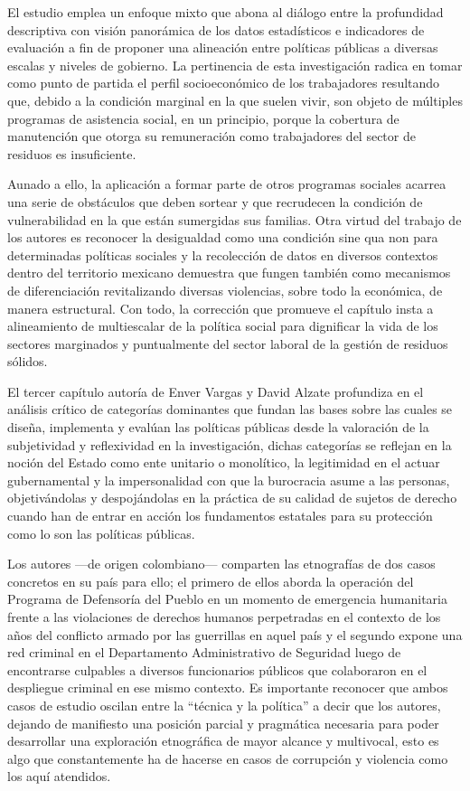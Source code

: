 \documentclass[
  spanish,
  11pt,
  a4paper,
]{scrbook}
\begin{document}
El estudio emplea un enfoque mixto que abona al diálogo entre la
profundidad descriptiva con visión panorámica de los datos estadísticos
e indicadores de evaluación a fin de proponer una alineación entre
políticas públicas a diversas escalas y niveles de gobierno. La
pertinencia de esta investigación radica en tomar como punto de partida
el perfil socioeconómico de los trabajadores resultando que, debido a la
condición marginal en la que suelen vivir, son objeto de múltiples
programas de asistencia social, en un principio, porque la cobertura de
manutención que otorga su remuneración como trabajadores del sector de
residuos es insuficiente.

Aunado a ello, la aplicación a formar parte de otros programas sociales
acarrea una serie de obstáculos que deben sortear y que recrudecen la
condición de vulnerabilidad en la que están sumergidas sus familias.
Otra virtud del trabajo de los autores es reconocer la desigualdad como
una condición sine qua non para determinadas políticas sociales y la
recolección de datos en diversos contextos dentro del territorio
mexicano demuestra que fungen también como mecanismos de diferenciación
revitalizando diversas violencias, sobre todo la económica, de manera
estructural. Con todo, la corrección que promueve el capítulo insta a
alineamiento de multiescalar de la política social para dignificar la
vida de los sectores marginados y puntualmente del sector laboral de la
gestión de residuos sólidos.

\vspace*{.75cm}

El tercer capítulo autoría de Enver Vargas y David Alzate profundiza en
el análisis crítico de categorías dominantes que fundan las bases sobre
las cuales se diseña, implementa y evalúan las políticas públicas desde
la valoración de la subjetividad y reflexividad en la investigación,
dichas categorías se reflejan en la noción del Estado como ente unitario
o monolítico, la legitimidad en el actuar gubernamental y la
impersonalidad con que la burocracia asume a las personas,
objetivándolas y despojándolas en la práctica de su calidad de sujetos
de derecho cuando han de entrar en acción los fundamentos estatales para
su protección como lo son las políticas públicas.

Los autores ---de origen colombiano--- comparten las etnografías de dos
casos concretos en su país para ello; el primero de ellos aborda la
operación del Programa de Defensoría del Pueblo en un momento de
emergencia humanitaria frente a las violaciones de derechos humanos
perpetradas en el contexto de los años del conflicto armado por las
guerrillas en aquel país y el segundo expone una red criminal en el
Departamento Administrativo de Seguridad luego de encontrarse culpables
a diversos funcionarios públicos que colaboraron en el despliegue
criminal en ese mismo contexto. Es importante reconocer que ambos casos
de estudio oscilan entre la ``técnica y la política'' a decir que los
autores, dejando de manifiesto una posición parcial y pragmática
necesaria para poder desarrollar una exploración etnográfica de mayor
alcance y multivocal, esto es algo que constantemente ha de hacerse en
casos de corrupción y violencia como los aquí atendidos.
\end{document}

